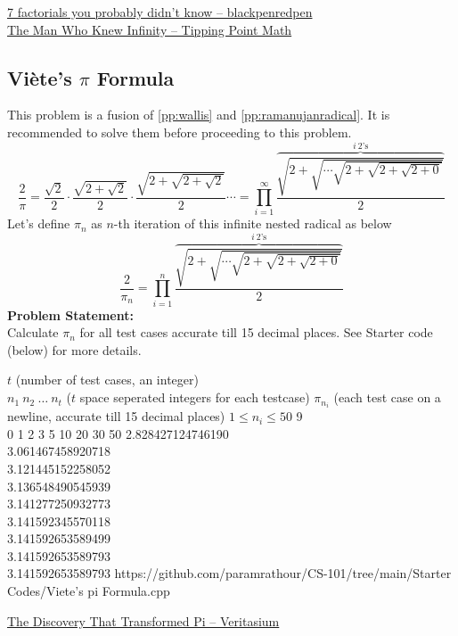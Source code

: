 \begin{funvideo}
\href{https://youtu.be/7eboFOkRHr4}{7 factorials you probably didn't know -- blackpenredpen}
\\\href{https://youtu.be/P0idBBhGNgU}{The Man Who Knew Infinity -- Tipping Point Math}
\end{funvideo}
\subsection{Viète's $\pi$ Formula}{\label{pp:vietesformula}}
This problem is a fusion of \ref{pp:wallis} and \ref{pp:ramanujanradical}. It is recommended to solve them before proceeding to this problem.
\begin{equation}
{ {\frac {2}{\pi }}={\frac {\sqrt {2}}{2}}\cdot {\frac {\sqrt {2+{\sqrt {2}}}}{2}}\cdot {\frac {\sqrt {2+{\sqrt {2+{\sqrt {2}}}}}}{2}}\cdots = \prod_{i = 1}^{\infty} \frac{\overbrace{\sqrt{2+\sqrt{\cdots{\sqrt{2+{\sqrt{2+\sqrt{2+0}}}}}}}}^{i\ 2\text{'s}}}{2}}
	\end{equation}
Let's define $\pi_n$ as $n$-th iteration of this infinite nested radical as below
\begin{equation*}
\frac{2}{\pi_n} = \prod_{i = 1}^{n} \frac{\overbrace{\sqrt{2+\sqrt{\cdots{\sqrt{2+{\sqrt{2+\sqrt{2+0}}}}}}}}^{i\ 2\text{'s}}}{2}
\end{equation*}
\textbf{Problem Statement:}\\
Calculate $\pi_n$ for all test cases accurate till 15 decimal places. See Starter code (below) for more details.
\begin{testcases}
	{$t$ \hfill(number of test cases, an integer)\\$n_1\ n_2\ \ldots\ n_t$ \hfill($t$ space seperated integers for each testcase)}
	{$\pi_{n_i}$ \hfill(each test case on a newline, accurate till 15 decimal places)}
	{$1 \leq n_i \leq 50$}
	{9\\0 1 2 3 5 10 20 30 50}
	{2.828427124746190\\3.061467458920718\\3.121445152258052\\3.136548490545939\\3.141277250932773\\3.141592345570118\\3.141592653589499\\3.141592653589793\\3.141592653589793}
	{https://github.com/paramrathour/CS-101/tree/main/Starter Codes/Viete's pi Formula.cpp}
\end{testcases}
\begin{funvideo}
\href{https://youtu.be/gMlf1ELvRzc}{The Discovery That Transformed Pi -- Veritasium}
\end{funvideo}
